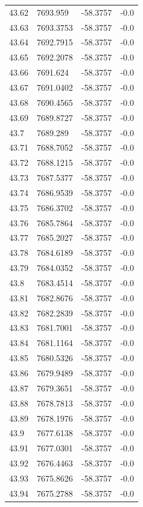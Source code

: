 \begin{table}[H]
\begin{tabular}{llll}
43.62 & 7693.959 & -58.3757 & -0.0 \\
43.63 & 7693.3753 & -58.3757 & -0.0 \\
43.64 & 7692.7915 & -58.3757 & -0.0 \\
43.65 & 7692.2078 & -58.3757 & -0.0 \\
43.66 & 7691.624 & -58.3757 & -0.0 \\
43.67 & 7691.0402 & -58.3757 & -0.0 \\
43.68 & 7690.4565 & -58.3757 & -0.0 \\
43.69 & 7689.8727 & -58.3757 & -0.0 \\
43.7 & 7689.289 & -58.3757 & -0.0 \\
43.71 & 7688.7052 & -58.3757 & -0.0 \\
43.72 & 7688.1215 & -58.3757 & -0.0 \\
43.73 & 7687.5377 & -58.3757 & -0.0 \\
43.74 & 7686.9539 & -58.3757 & -0.0 \\
43.75 & 7686.3702 & -58.3757 & -0.0 \\
43.76 & 7685.7864 & -58.3757 & -0.0 \\
43.77 & 7685.2027 & -58.3757 & -0.0 \\
43.78 & 7684.6189 & -58.3757 & -0.0 \\
43.79 & 7684.0352 & -58.3757 & -0.0 \\
43.8 & 7683.4514 & -58.3757 & -0.0 \\
43.81 & 7682.8676 & -58.3757 & -0.0 \\
43.82 & 7682.2839 & -58.3757 & -0.0 \\
43.83 & 7681.7001 & -58.3757 & -0.0 \\
43.84 & 7681.1164 & -58.3757 & -0.0 \\
43.85 & 7680.5326 & -58.3757 & -0.0 \\
43.86 & 7679.9489 & -58.3757 & -0.0 \\
43.87 & 7679.3651 & -58.3757 & -0.0 \\
43.88 & 7678.7813 & -58.3757 & -0.0 \\
43.89 & 7678.1976 & -58.3757 & -0.0 \\
43.9 & 7677.6138 & -58.3757 & -0.0 \\
43.91 & 7677.0301 & -58.3757 & -0.0 \\
43.92 & 7676.4463 & -58.3757 & -0.0 \\
43.93 & 7675.8626 & -58.3757 & -0.0 \\
43.94 & 7675.2788 & -58.3757 & -0.0 \\

\end{tabular}
\end{table}
